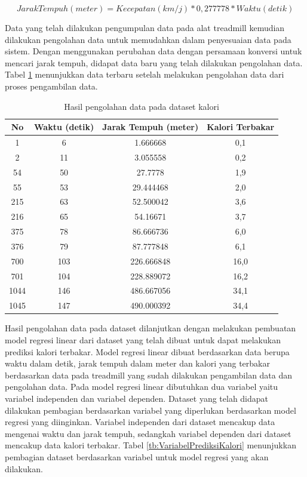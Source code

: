\begin{equation}
  \label{eq:KonversiJarakTempuh}
  Jarak Tempuh(meter) = Kecepatan(km/j)*0,277778*Waktu(detik)
\end{equation}

Data yang telah dilakukan pengumpulan data pada alat treadmill kemudian dilakukan pengolahan data untuk memudahkan dalam penyesuaian data pada sistem. Dengan menggunakan perubahan data dengan persamaan konversi untuk mencari jarak tempuh, didapat data baru yang telah dilakukan pengolahan data. Tabel \ref{tb:OlahDatasetRegresi} menunjukkan data terbaru setelah melakukan pengolahan data dari proses pengambilan data. 

\begin{longtable}{|c|c|c|c|}
  \caption{Hasil pengolahan data pada dataset kalori}
  \label{tb:OlahDatasetRegresi}                                   \\
  \hline
  \rowcolor[HTML]{C0C0C0}
  \textbf{No} & \textbf{Waktu (detik)} & \textbf{Jarak Tempuh (meter)} & \textbf{Kalori Terbakar} \\
  \hline
  1   & 6    & 1.666668    & 0,1     \\
  \hline
  2   & 11    & 3.055558    & 0,2     \\
  \hline
  54   & 50    & 27.7778    & 1,9     \\
  \hline
  55   & 53    & 29.444468    & 2,0     \\
  \hline
  215   & 63    & 52.500042    & 3,6     \\
  \hline
  216   & 65    & 54.16671    & 3,7     \\
  \hline
  375   & 78    & 86.666736    & 6,0     \\
  \hline
  376   & 79    & 87.777848    & 6,1     \\
  \hline
  700   & 103    & 226.666848    & 16,0     \\
  \hline
  701   & 104    & 228.889072    & 16,2     \\
  \hline
  1044   & 146    & 486.667056    & 34,1     \\
  \hline
  1045   & 147    & 490.000392    & 34,4     \\
  \hline
\end{longtable}

Hasil pengolahan data pada dataset dilanjutkan dengan melakukan pembuatan model regresi linear dari dataset yang telah dibuat untuk dapat melakukan prediksi kalori terbakar. Model regresi linear dibuat berdasarkan data berupa waktu dalam detik, jarak tempuh dalam meter dan kalori yang terbakar berdasarkan data pada treadmill yang sudah dilakukan pengambilan data dan pengolahan data. Pada model regresi linear dibutuhkan dua variabel yaitu variabel independen dan variabel dependen. Dataset yang telah didapat dilakukan pembagian berdasarkan variabel yang diperlukan berdasarkan model regresi yang diinginkan. Variabel independen dari dataset mencakup data mengenai waktu dan jarak tempuh, sedangkah variabel dependen dari dataset mencakup data kalori terbakar. Tabel \ref{tb:VariabelPrediksiKalori} menunjukkan pembagian dataset berdasarkan variabel untuk model regresi yang akan dilakukan. \lipsum[1][1-3]

